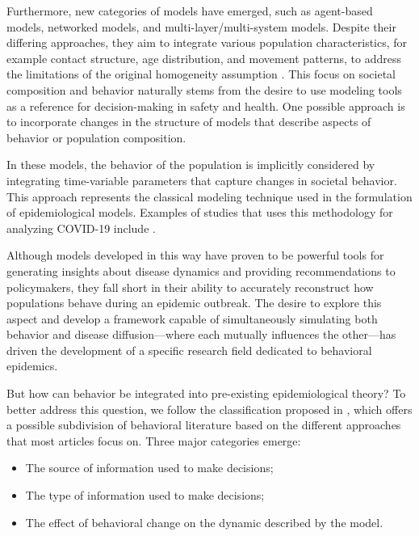 Furthermore, new categories of models have emerged, such as agent-based models, networked models, and multi-layer/multi-system models. Despite their differing approaches, they aim to integrate various population characteristics, for example contact structure, age distribution, and movement patterns, to address the limitations of the original homogeneity assumption \cite{brauer2012mathematical}.
This focus on societal composition and behavior naturally stems from the desire to use modeling tools as a reference for decision-making in safety and health. 
One possible approach is to incorporate changes in the structure of models that describe aspects of behavior or population composition.

In these models, the behavior of the population is implicitly considered by integrating time-variable parameters that capture changes in societal behavior. This approach represents the classical modeling technique used in the formulation of epidemiological models. Examples of studies that uses this methodology for analyzing COVID-19 include \cite{Giordano_2020, Dehning_2020, Proverbio_2021}.

Although models developed in this way have proven to be powerful tools for generating insights about disease dynamics and providing recommendations to policymakers, they fall short in their ability to accurately reconstruct how populations behave during an epidemic outbreak. The desire to explore this aspect and develop a framework capable of simultaneously simulating both behavior and disease diffusion—where each mutually influences the other—has driven the development of a specific research field dedicated to behavioral epidemics.

But how can behavior be integrated into pre-existing epidemiological theory? To better address this question, we follow the classification proposed in \cite{Funk_2010}, which offers a possible subdivision of behavioral literature based on the different approaches that most articles focus on. Three major categories emerge:
\begin{itemize}
	\item The source of information used to make decisions;
	\item The type of information used to make decisions;
	\item The effect of behavioral change on the dynamic described by  the model. 
\end{itemize}

